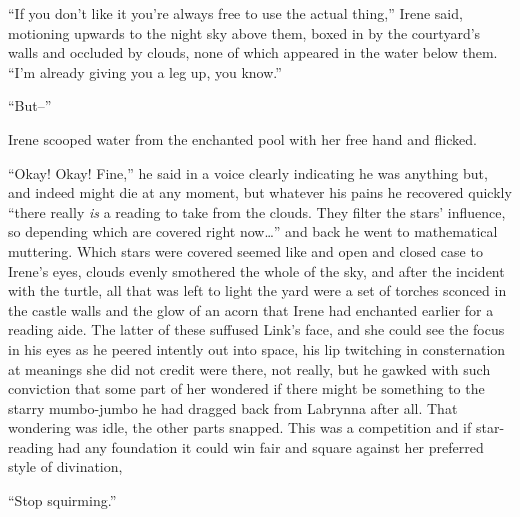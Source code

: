 \documentclass[../FGP.tex]{subfiles}
\begin{document}
``If you don't like it you're always free to use the actual thing,'' Irene said, motioning upwards to the night sky above them, boxed in by the courtyard's walls and occluded by clouds, none of which appeared in the water below them. ``I'm already giving you a leg up, you know.''

``But--'' 

Irene scooped water from the enchanted pool with her free hand and flicked. 

``Okay! Okay! Fine,'' he said in a voice clearly indicating he was anything but, and indeed might die at any moment, but whatever his pains he recovered quickly ``there really \emph{is} a reading to take from the clouds. They filter the stars' influence, so depending which are covered right now\ldots'' and back he went to mathematical muttering. Which stars were covered seemed like and open and closed case to Irene's eyes, clouds evenly smothered the whole of the sky, and after the incident with the turtle, all that was left to light the yard were a set of torches sconced in the castle walls and the glow of an acorn that Irene had enchanted earlier for a reading aide. The latter of these suffused Link's face, and she could see the focus in his eyes as he peered intently out into space, his lip twitching in consternation at meanings she did not credit were there, not really, but he gawked with such conviction that some part of her wondered if there might be something to the starry mumbo-jumbo he had dragged back from Labrynna after all.%
That wondering was idle, the other parts snapped. This was a competition and if star-reading had any foundation it could win fair and square against her preferred style of divination,%
 
 ``Stop squirming.''
\end{document}
